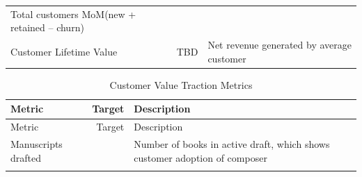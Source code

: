 \documentclass[11pt,openany]{book}
\begin{document}
\begin{longtable}[]{@{}lrl@{}}
\begin{minipage}[t]{0.48\columnwidth}
Total customers MoM(new + retained -- churn)\strut
\end{minipage}\tabularnewline
\begin{minipage}[t]{0.35\columnwidth}\raggedright
Customer Lifetime Value\strut
\end{minipage} & \begin{minipage}[t]{0.08\columnwidth}\raggedleft
TBD\strut
\end{minipage} & \begin{minipage}[t]{0.48\columnwidth}\raggedright
Net revenue generated by average customer\strut
\end{minipage}\tabularnewline
\bottomrule
\end{longtable}

\begin{longtable}[]{@{}lrl@{}}
\caption{Customer Value Traction Metrics}\tabularnewline
\toprule
\begin{minipage}[b]{0.35\columnwidth}\raggedright
Metric\strut
\end{minipage} & \begin{minipage}[b]{0.08\columnwidth}\raggedleft
Target\strut
\end{minipage} & \begin{minipage}[b]{0.48\columnwidth}\raggedright
Description\strut
\end{minipage}\tabularnewline
\midrule
\endfirsthead
\toprule
\begin{minipage}[b]{0.35\columnwidth}\raggedright
Metric\strut
\end{minipage} & \begin{minipage}[b]{0.08\columnwidth}\raggedleft
Target\strut
\end{minipage} & \begin{minipage}[b]{0.48\columnwidth}\raggedright
Description\strut
\end{minipage}\tabularnewline
\midrule
\endhead
\begin{minipage}[t]{0.35\columnwidth}\raggedright
Manuscripts drafted\strut
\end{minipage} & \begin{minipage}[t]{0.08\columnwidth}\raggedleft
750\strut
\end{minipage} & \begin{minipage}[t]{0.48\columnwidth}\raggedright
Number of books in active draft, which shows customer adoption of
composer\strut
\end{minipage}\tabularnewline
\begin{minipage}[t]{0.35\columnwidth}\raggedright

\end{minipage}
\end{longtable}
\end{document}
